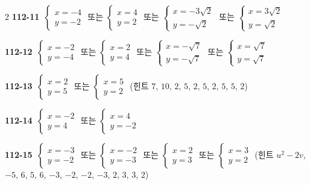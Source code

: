 \documentclass[10pt,a4paper]{article}
\begin{document}
\begin{multicols}{2}
\noindent\textbf{112-11}\ $\begin{cases} x=-4 \\ y=-2 \end{cases}$ 또는 $\begin{cases} x=4 \\ y=2 \end{cases}$ 또는 $\begin{cases} x=-3\sqrt{2} \\ y=-\sqrt{2} \end{cases}$ 또는 $\begin{cases} x=3\sqrt{2} \\ y=\sqrt{2} \end{cases}$\par
\noindent\textbf{112-12}\ $\begin{cases} x=-2 \\ y=-4 \end{cases}$ 또는 $\begin{cases} x=2 \\ y=4 \end{cases}$ 또는 $\begin{cases} x=-\sqrt{7} \\ y=-\sqrt{7} \end{cases}$ 또는 $\begin{cases} x=\sqrt{7} \\ y=\sqrt{7} \end{cases}$\par
\noindent\textbf{112-13}\ $\begin{cases} x=2 \\ y=5 \end{cases}$ 또는 $\begin{cases} x=5 \\ y=2 \end{cases}$ (힌트 $7$, $10$, $2$, $5$, $2$, $5$, $2$, $5$, $5$, $2$)\par
\noindent\textbf{112-14}\ $\begin{cases} x=-2 \\ y=4 \end{cases}$ 또는 $\begin{cases} x=4 \\ y=-2 \end{cases}$\par
\noindent\textbf{112-15}\ $\begin{cases} x=-3 \\ y=-2 \end{cases}$ 또는 $\begin{cases} x=-2 \\ y=-3 \end{cases}$ 또는 $\begin{cases} x=2 \\ y=3 \end{cases}$ 또는 $\begin{cases} x=3 \\ y=2 \end{cases}$ (힌트 $u^2-2v$, $-5$, $6$, $5$, $6$, $-3$, $-2$, $-2$, $-3$, $2$, $3$, $3$, $2$)\par

\end{multicols}
\end{document}
